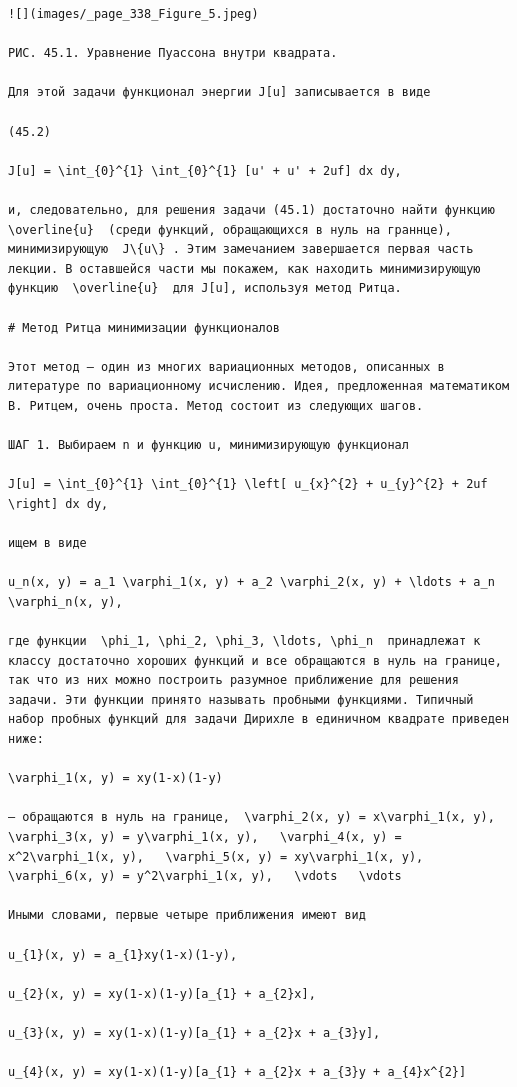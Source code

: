 \documentclass[
  ukrainian,
]{article}
\begin{document}
\begin{verbatim}
![](images/_page_338_Figure_5.jpeg)

РИС. 45.1. Уравнение Пуассона внутри квадрата.

Для этой задачи функционал энергии J[u] записывается в виде

(45.2)

J[u] = \int_{0}^{1} \int_{0}^{1} [u' + u' + 2uf] dx dy,

и, следовательно, для решения задачи (45.1) достаточно найти функцию  \overline{u}  (среди функций, обращающихся в нуль на граннце), минимизирующую  J\{u\} . Этим замечанием завершается первая часть лекции. В оставшейся части мы покажем, как находить минимизирующую функцию  \overline{u}  для J[u], используя метод Ритца.

# Метод Ритца минимизации функционалов

Этот метод — один из многих вариационных методов, описанных в литературе по вариационному исчислению. Идея, предложенная математиком В. Ритцем, очень проста. Метод состоит из следующих шагов.

ШАГ 1. Выбираем n и функцию u, минимизирующую функционал

J[u] = \int_{0}^{1} \int_{0}^{1} \left[ u_{x}^{2} + u_{y}^{2} + 2uf \right] dx dy,

ищем в виде

u_n(x, y) = a_1 \varphi_1(x, y) + a_2 \varphi_2(x, y) + \ldots + a_n \varphi_n(x, y),

где функции  \phi_1, \phi_2, \phi_3, \ldots, \phi_n  принадлежат к классу достаточно хороших функций и все обращаются в нуль на границе, так что из них можно построить разумное приближение для решения задачи. Эти функции принято называть пробными функциями. Типичный набор пробных функций для задачи Дирихле в единичном квадрате приведен ниже:

\varphi_1(x, y) = xy(1-x)(1-y)

— обращаются в нуль на границе,  \varphi_2(x, y) = x\varphi_1(x, y),   \varphi_3(x, y) = y\varphi_1(x, y),   \varphi_4(x, y) = x^2\varphi_1(x, y),   \varphi_5(x, y) = xy\varphi_1(x, y),   \varphi_6(x, y) = y^2\varphi_1(x, y),   \vdots   \vdots

Иными словами, первые четыре приближения имеют вид

u_{1}(x, y) = a_{1}xy(1-x)(1-y),

u_{2}(x, y) = xy(1-x)(1-y)[a_{1} + a_{2}x],

u_{3}(x, y) = xy(1-x)(1-y)[a_{1} + a_{2}x + a_{3}y],

u_{4}(x, y) = xy(1-x)(1-y)[a_{1} + a_{2}x + a_{3}y + a_{4}x^{2}]


\end{verbatim}
\end{document}
